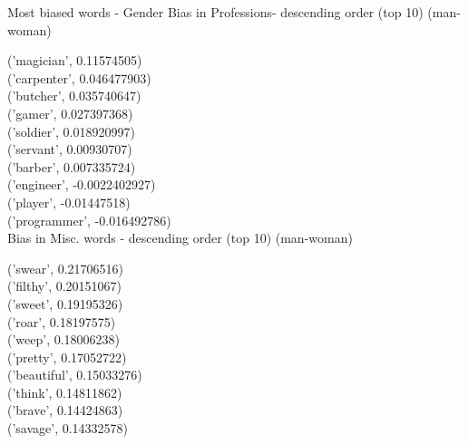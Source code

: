 \documentclass{beamer}
\begin{document}
	
	\begin{frame}[allowframebreaks]{Most biased words - Gender}
		Bias in Professions- descending order (top 10) (man-woman)
		
		('magician', 0.11574505) \\
		('carpenter', 0.046477903)
\\
		('butcher', 0.035740647)
 \\
		('gamer', 0.027397368)
\\
		('soldier', 0.018920997)
\\
		('servant', 0.00930707)
\\
		('barber', 0.007335724)
\\
		('engineer', -0.0022402927)  \\
		('player', -0.01447518)
\\
		('programmer', -0.016492786) \\
		
		\vspace{5mm}
		Bias in Misc. words - descending order (top 10) (man-woman)
		
		('swear', 0.21706516)
\\
		('filthy', 0.20151067)
\\
		('sweet', 0.19195326)
\\
		('roar', 0.18197575)
\\
		('weep', 0.18006238)
\\ 
		('pretty', 0.17052722)
\\
		('beautiful', 0.15033276) \\
		('think', 0.14811862)
\\
		('brave', 0.14424863)
\\
		('savage', 0.14332578) \\
	\end{frame}
\end{document}
